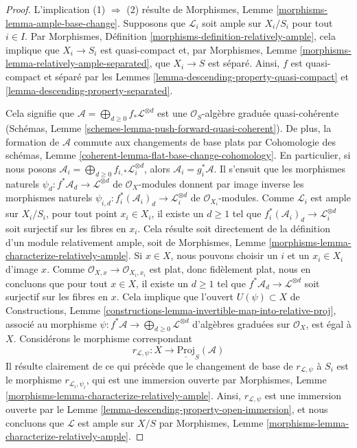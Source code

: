 \begin{proof}
L'implication (1) $\Rightarrow$ (2) résulte de
Morphismes, Lemme \ref{morphisms-lemma-ample-base-change}.
Supposons que $\mathcal{L}_i$ soit ample sur $X_i/S_i$ pour tout $i \in I$.
Par Morphismes, Définition \ref{morphisms-definition-relatively-ample},
cela implique que $X_i \to S_i$ est quasi-compact et, par
Morphismes, Lemme \ref{morphisms-lemma-relatively-ample-separated},
que $X_i \to S$ est séparé.
Ainsi, $f$ est quasi-compact et séparé par les
Lemmes \ref{lemma-descending-property-quasi-compact} et
\ref{lemma-descending-property-separated}.

\medskip\noindent
Cela signifie que
$\mathcal{A} = \bigoplus_{d \geq 0} f_*\mathcal{L}^{\otimes d}$
est une $\mathcal{O}_S$-algèbre graduée quasi-cohérente
(Schémas, Lemme \ref{schemes-lemma-push-forward-quasi-coherent}).
De plus, la formation de $\mathcal{A}$ commute aux changements de base plats par
Cohomologie des schémas,
Lemme \ref{coherent-lemma-flat-base-change-cohomology}.
En particulier, si nous posons
$\mathcal{A}_i = \bigoplus_{d \geq 0} f_{i, *}\mathcal{L}_i^{\otimes d}$,
alors $\mathcal{A}_i = g_i^*\mathcal{A}$.
Il s'ensuit que les morphismes naturels
$\psi_d : f^*\mathcal{A}_d \to \mathcal{L}^{\otimes d}$
de $\mathcal{O}_X$-modules donnent par image inverse les morphismes naturels
$\psi_{i, d} : f_i^*(\mathcal{A}_i)_d \to \mathcal{L}_i^{\otimes d}$
de $\mathcal{O}_{X_i}$-modules. Comme $\mathcal{L}_i$ est ample sur $X_i/S_i$,
pour tout point $x_i \in X_i$, il existe un $d \geq 1$ tel que
$f_i^*(\mathcal{A}_i)_d \to \mathcal{L}_i^{\otimes d}$
soit surjectif sur les fibres en $x_i$. Cela résulte soit directement
de la définition d'un module relativement ample, soit de
Morphismes, Lemme \ref{morphisms-lemma-characterize-relatively-ample}.
Si $x \in X$, nous pouvons choisir un $i$ et un $x_i \in X_i$
d'image $x$. Comme $\mathcal{O}_{X, x} \to \mathcal{O}_{X_i, x_i}$
est plat, donc fidèlement plat, nous en concluons que pour tout $x \in X$,
il existe un $d \geq 1$ tel que
$f^*\mathcal{A}_d \to \mathcal{L}^{\otimes d}$
soit surjectif sur les fibres en $x$.
Cela implique que l'ouvert $U(\psi) \subset X$ de
Constructions, Lemme
\ref{constructions-lemma-invertible-map-into-relative-proj},
associé au morphisme
$\psi : f^*\mathcal{A} \to \bigoplus_{d \geq 0} \mathcal{L}^{\otimes d}$
d'algèbres graduées sur $\mathcal{O}_X$,
est égal à $X$. Considérons le morphisme correspondant
$$
r_{\mathcal{L}, \psi} : X \longrightarrow \underline{\text{Proj}}_S(\mathcal{A})
$$
Il résulte clairement de ce qui précède que le changement de base de
$r_{\mathcal{L}, \psi}$ à $S_i$ est le morphisme
$r_{\mathcal{L}_i, \psi_i}$, qui est une immersion ouverte par
Morphismes, Lemme \ref{morphisms-lemma-characterize-relatively-ample}.
Ainsi, $r_{\mathcal{L}, \psi}$ est une immersion ouverte par le
Lemme \ref{lemma-descending-property-open-immersion},
et nous concluons que $\mathcal{L}$ est ample sur $X/S$ par
Morphismes, Lemme \ref{morphisms-lemma-characterize-relatively-ample}.
\end{proof}
